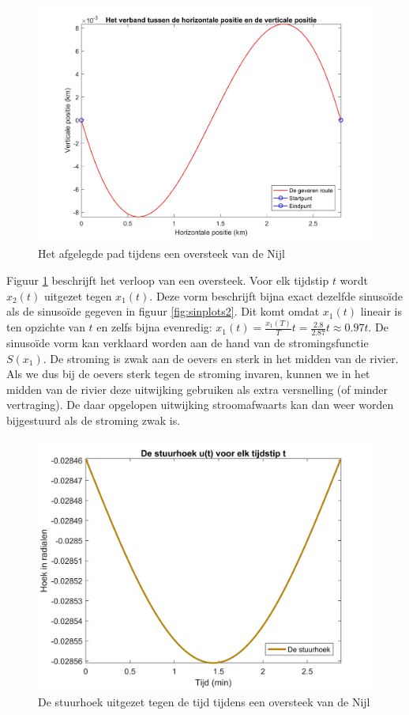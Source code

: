 \begin{figure}[H]
	\centering
	\includegraphics[width=\textwidth]{Sin_xy_2.jpg}
	\caption{Het afgelegde pad tijdens een oversteek van de Nijl}\label{fig:sinplots3}
\end{figure}
Figuur \ref{fig:sinplots3} beschrijft het verloop van een oversteek.
Voor elk tijdstip \(t\) wordt \(x_2(t)\) uitgezet tegen \(x_1(t)\).
Deze vorm beschrijft bijna exact dezelfde sinuso\"ide als de sinuso\"ide gegeven in figuur \ref{fig:sinplots2}.
Dit komt omdat \(x_1(t)\) lineair is ten opzichte van \(t\) en zelfs bijna evenredig: \(x_1(t)= \frac{x_1(T)}{T}t=\frac{2.8}{2.87}t\approx 0.97t\).
De sinuso\"ide vorm kan verklaard worden aan de hand van de stromingsfunctie \(S(x_1)\).
De stroming is zwak aan de oevers en sterk in het midden van de rivier.
Als we dus bij de oevers sterk tegen de stroming invaren, kunnen we in het midden van de rivier deze uitwijking gebruiken als extra versnelling (of minder vertraging).
De daar opgelopen uitwijking stroomafwaarts kan dan weer worden bijgestuurd als de stroming zwak is.
\begin{figure}[H]
	\centering
	\includegraphics[width=\textwidth]{Sin_stuur_4.jpg}
	\caption{De stuurhoek uitgezet tegen de tijd tijdens een oversteek van de Nijl}\label{fig:sinplots4}
\end{figure}
